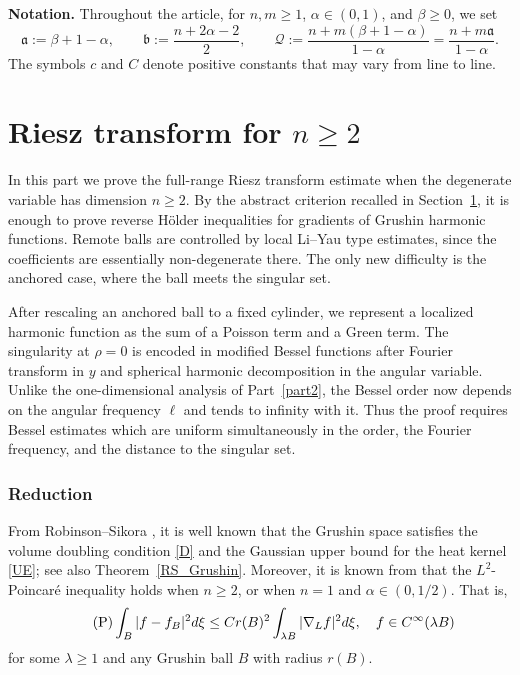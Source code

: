 \documentclass[12pt]{amsart}
\begin{document}
\noindent\textbf{Notation.}
Throughout the article, for $n,m\geq 1$, $\alpha\in(0,1)$, and $\beta\geq 0$, we set
\begin{equation*}
    \mathfrak a:=\beta+1-\alpha,
    \qquad
    \mathfrak b:=\frac{n+2\alpha-2}{2},
    \qquad
    \mathcal Q
    :=\frac{n+m(\beta+1-\alpha)}{1-\alpha}
    =\frac{n+m\mathfrak a}{1-\alpha}.
\end{equation*}
The symbols $c$ and $C$ denote positive constants that may vary from line to line.





\part{Riesz transform for \texorpdfstring{$n\ge 2$}{n>=2}}\label{part1}


In this part we prove the full-range Riesz transform estimate when the degenerate variable has dimension $n\geq2$. By the abstract criterion recalled in Section~\ref{sec3}, it is enough to prove reverse H\"older inequalities for gradients of Grushin harmonic functions. Remote balls are controlled by local Li--Yau type estimates, since the coefficients are essentially non-degenerate there. The only new difficulty is the anchored case, where the ball meets the singular set.

After rescaling an anchored ball to a fixed cylinder, we represent a localized harmonic function as the sum of a Poisson term and a Green term. The singularity at $\rho=0$ is encoded in modified Bessel functions after Fourier transform in $y$ and spherical harmonic decomposition in the angular variable. Unlike the one-dimensional analysis of Part~\ref{part2}, the Bessel order now depends on the angular frequency $\ell$ and tends to infinity with it. Thus the proof requires Bessel estimates which are uniform simultaneously in the order, the Fourier frequency, and the distance to the singular set.


 



\section{Reduction}\label{sec3}






From Robinson–Sikora \cite{RS}, it is well known that the Grushin space satisfies the volume doubling condition \eqref{D} and the Gaussian upper bound for the heat kernel \eqref{UE}; see also Theorem~\ref{RS_Grushin}. Moreover, it is known from \cite{RS2} that the $L^2$-Poincar\'e inequality holds when $n\ge 2$, or when $n=1$ and $\alpha \in (0,1/2)$. That is,
\begin{equation}\label{P2}\tag{$\mathrm{P}$}
\int_B |f-f_B|^2 d\xi \le C r(B)^2 \int_{\lambda B} |\nabla_L f|^2 d\xi,\quad f\in C^\infty(\lambda B)
\end{equation}
for some $\lambda \ge 1$ and any Grushin ball $B$ with radius $r(B)$.
\end{document}
